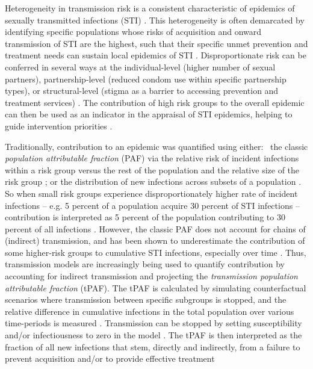 Heterogeneity in transmission risk is a consistent characteristic of
epidemics of sexually transmitted infections (STI) \citep{Anderson1991}.
This heterogeneity is often demarcated by identifying
specific populations whose risks of acquisition and onward transmission of STI are the highest,
such that their specific unmet prevention and treatment needs
can sustain local epidemics of STI \citep{Yorke1978}.
Disproportionate risk can be conferred in several ways at the
individual-level (higher number of sexual partners), 
partnership-level (reduced condom use within specific partnership types), 
or structural-level (stigma as a barrier to accessing prevention and treatment services)
\citep{Baral2013}.
The contribution of high risk groups to the overall epidemic
can then be used as an indicator in the appraisal of STI epidemics,
helping to guide intervention priorities
\citep{Shubber2014,Mishra2016}.
\par
Traditionally, contribution to an epidemic was quantified using either:\ %
the classic \textit{population attributable fraction} (PAF)
via the relative risk of incident infections within a risk group
versus the rest of the population
and the relative size of the risk group \citep{Hanley2001};
or the distribution of new infections across subsets of a population
\citep{Case2012,Mishra2014}.
So when small risk groups experience disproportionately higher rate of
incident infections -- e.g. 5 percent of a population acquire 30 percent
of STI infections -- contribution is interpreted as 5 percent of the population contributing to
30 percent of all infections \citep{Pruss-Ustun2013}.
However, the classic PAF does not account for chains of (indirect) transmission, and has been
shown to underestimate the contribution of some higher-risk groups to cumulative
STI infections, especially over time \citep{Mishra2014}.
Thus, transmission models are increasingly being used to quantify
contribution by accounting for indirect transmission and projecting
the \textit{transmission population attributable fraction} (tPAF).
The tPAF is calculated by
simulating counterfactual scenarios where transmission
between specific subgroups is stopped, and
the relative difference in cumulative infections in the total population
over various time-periods is measured \citep{Mishra2014,Mukandavire2018}.
Transmission can be stopped by
setting susceptibility and/or infectiousness to zero in the model \citep{Mishra2014}.
The tPAF is then interpreted as
the fraction of all new infections that stem, directly and indirectly, from
a failure to prevent acquisition and/or to provide effective treatment
